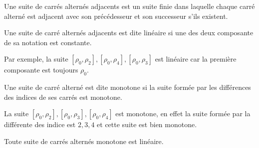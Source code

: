 \begin{definition}
  Une suite de carrés alternés adjacents est un suite finie dans laquelle chaque carré alterné est adjacent avec son précédesseur et son successeur s'ils existent.
\end{definition}

\begin{definition}
  Une suite de carré alternés adjacents est dite linéaire si une des deux composante de sa notation est constante.
\end{definition}

Par exemple, la suite $[\rho_0, \rho_2], [\rho_0, \rho_4], [\rho_0, \rho_3]$ est linéaire car la première composante est toujours $\rho_0$.

\begin{definition}
  Une suite de carré alterné est dite monotone si la suite formée par les différences des indices de ses carrés est monotone.
\end{definition}

La suite $[\rho_0, \rho_2], [\rho_0, \rho_3], [\rho_0, \rho_4]$ est monotone, en effet la suite formée par la différente des indice est $2, 3, 4$ et cette suite est bien monotone.

\begin{proposition}
  Toute suite de carrés alternés monotone est linéaire.
\end{proposition}

